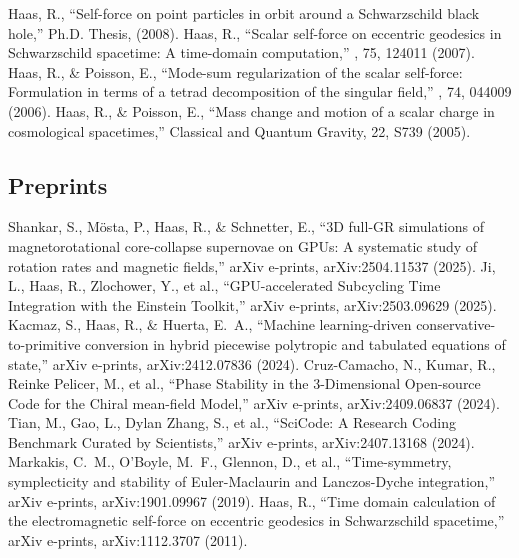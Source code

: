  Haas, R., ``Self-force on point particles in orbit around a Schwarzschild black hole,'' Ph.D. Thesis, (2008).
 Haas, R., ``Scalar self-force on eccentric geodesics in Schwarzschild spacetime: A time-domain computation,'' \prd, 75, 124011 (2007).
 Haas, R., \& Poisson, E., ``Mode-sum regularization of the scalar self-force: Formulation in terms of a tetrad decomposition of the singular field,'' \prd, 74, 044009 (2006).
 Haas, R., \& Poisson, E., ``Mass change and motion of a scalar charge in cosmological spacetimes,'' Classical and Quantum Gravity, 22, S739 (2005).

\subsection{Preprints}
 Shankar, S., M{\"o}sta, P., Haas, R., \& Schnetter, E., ``3D full-GR simulations of magnetorotational core-collapse supernovae on GPUs: A systematic study of rotation rates and magnetic fields,'' arXiv e-prints, arXiv:2504.11537 (2025).
 Ji, L., Haas, R., Zlochower, Y., et al., ``GPU-accelerated Subcycling Time Integration with the Einstein Toolkit,'' arXiv e-prints, arXiv:2503.09629 (2025).
 Kacmaz, S., Haas, R., \& Huerta, E.~A., ``Machine learning-driven conservative-to-primitive conversion in hybrid piecewise polytropic and tabulated equations of state,'' arXiv e-prints, arXiv:2412.07836 (2024).
 Cruz-Camacho, N., Kumar, R., Reinke Pelicer, M., et al., ``Phase Stability in the 3-Dimensional Open-source Code for the Chiral mean-field Model,'' arXiv e-prints, arXiv:2409.06837 (2024).
 Tian, M., Gao, L., Dylan Zhang, S., et al., ``SciCode: A Research Coding Benchmark Curated by Scientists,'' arXiv e-prints, arXiv:2407.13168 (2024).
 Markakis, C.~M., O'Boyle, M.~F., Glennon, D., et al., ``Time-symmetry, symplecticity and stability of Euler-Maclaurin and Lanczos-Dyche integration,'' arXiv e-prints, arXiv:1901.09967 (2019).
 Haas, R., ``Time domain calculation of the electromagnetic self-force on eccentric geodesics in Schwarzschild spacetime,'' arXiv e-prints, arXiv:1112.3707 (2011).

